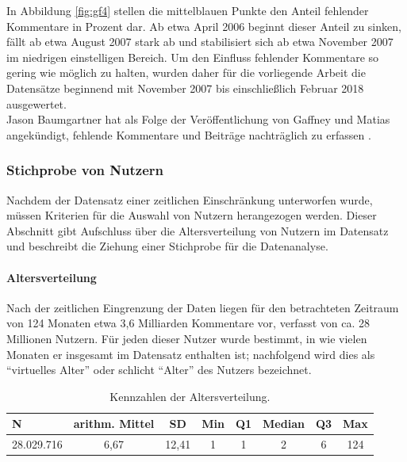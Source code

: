 \documentclass[11pt,a4paper,twoside]{article}
\let\oldpar\paragraph
\renewcommand{\paragraph}{\oldpar*}
\begin{document}
In Abbildung \ref{fig:gf4} stellen die mittelblauen Punkte den Anteil
fehlender Kommentare in Prozent dar. Ab etwa April 2006 beginnt dieser
Anteil zu sinken, fällt ab etwa August 2007 stark ab und stabilisiert
sich ab etwa November 2007 im niedrigen einstelligen Bereich. Um den
Einfluss fehlender Kommentare so gering wie möglich zu halten, wurden
daher für die vorliegende Arbeit die Datensätze beginnend mit November
2007 bis einschließlich Februar 2018 ausgewertet.\\
Jason Baumgartner hat als Folge der Veröffentlichung von Gaffney und
Matias angekündigt, fehlende Kommentare und Beiträge nachträglich zu
erfassen \autocite{Baumgartner2018}.

\hypertarget{stichprobe}{%
\subsubsection{Stichprobe von Nutzern}\label{stichprobe}}

Nachdem der Datensatz einer zeitlichen Einschränkung unterworfen wurde,
müssen Kriterien für die Auswahl von Nutzern herangezogen werden. Dieser
Abschnitt gibt Aufschluss über die Altersverteilung von Nutzern im
Datensatz und beschreibt die Ziehung einer Stichprobe für die
Datenanalyse.

\hypertarget{altersverteilung}{%
\paragraph{Altersverteilung}\label{altersverteilung}}

Nach der zeitlichen Eingrenzung der Daten liegen für den betrachteten
Zeitraum von 124 Monaten etwa 3,6 Milliarden Kommentare vor, verfasst
von ca. 28 Millionen Nutzern. Für jeden dieser Nutzer wurde bestimmt, in
wie vielen Monaten er insgesamt im Datensatz enthalten ist; nachfolgend
wird dies als \enquote{virtuelles Alter} oder schlicht \enquote{Alter}
des Nutzers bezeichnet.



\begin{table}

\caption{\label{tab:summary-age-tab}Kennzahlen der Altersverteilung.}
\centering
\begin{tabular}[t]{lccccccc}
\toprule
N & arithm. Mittel & SD & Min & Q1 & Median & Q3 & Max\\
\midrule
28.029.716 & 6,67 & 12,41 & 1 & 1 & 2 & 6 & 124\\
\bottomrule
\end{tabular}
\end{table}
\end{document}
